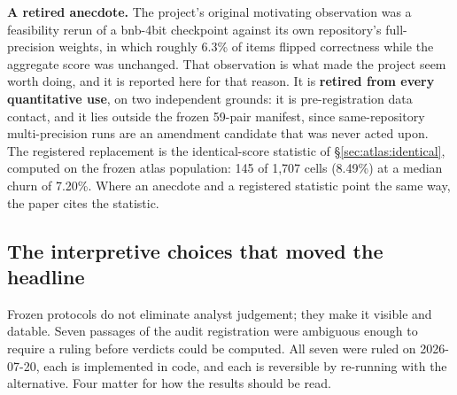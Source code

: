 \textbf{A retired anecdote.} The project's original motivating observation was a
feasibility rerun of a bnb-4bit checkpoint against its own repository's
full-precision weights, in which roughly 6.3\% of items flipped correctness while
the aggregate score was unchanged. That observation is what made the project
seem worth doing, and it is reported here for that reason. It is
\textbf{retired from every quantitative use}, on two independent grounds: it is
pre-registration data contact, and it lies outside the frozen 59-pair manifest,
since same-repository multi-precision runs are an amendment candidate that was
never acted upon. The registered replacement is the identical-score statistic of
\S\ref{sec:atlas:identical}, computed on the frozen atlas population: 145 of
1{,}707 cells (8.49\%) at a median churn of 7.20\%. Where an anecdote and a
registered statistic point the same way, the paper cites the statistic.

\subsection{The interpretive choices that moved the headline}
\label{app:prereg:choices}

Frozen protocols do not eliminate analyst judgement; they make it visible and
datable. Seven passages of the audit registration were ambiguous enough to
require a ruling before verdicts could be computed. All seven were ruled on
2026-07-20, each is implemented in code, and each is reversible by re-running
with the alternative. Four matter for how the results should be read.

